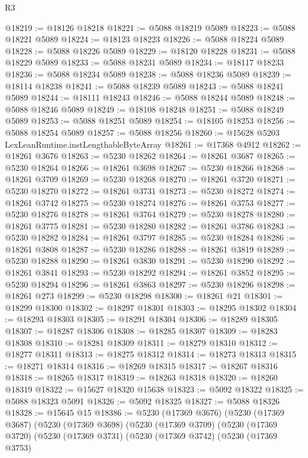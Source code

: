 \begin{lexlean}{R3}
\begin{coremodule}
@18219 := @18126 @18218
@18221 := @5088 @18219 @5089
@18223 := @5088 @18221 @5089
@18224 := @18123 @18223
@18226 := @5088 @18224 @5089
@18228 := @5088 @18226 @5089
@18229 := @18120 @18228
@18231 := @5088 @18229 @5089
@18233 := @5088 @18231 @5089
@18234 := @18117 @18233
@18236 := @5088 @18234 @5089
@18238 := @5088 @18236 @5089
@18239 := @18114 @18238
@18241 := @5088 @18239 @5089
@18243 := @5088 @18241 @5089
@18244 := @18111 @18243
@18246 := @5088 @18244 @5089
@18248 := @5088 @18246 @5089
@18249 := @18108 @18248
@18251 := @5088 @18249 @5089
@18253 := @5088 @18251 @5089
@18254 := @18105 @18253
@18256 := @5088 @18254 @5089
@18257 := @5088 @18256
@18260 := @15628 @5203 LexLeanRuntime.instLengthableByteArray
@18261 := @17368 @4912
@18262 := @18261 @3676
@18263 := @5230 @18262
@18264 := @18261 @3687
@18265 := @5230 @18264
@18266 := @18261 @3698
@18267 := @5230 @18266
@18268 := @18261 @3709
@18269 := @5230 @18268
@18270 := @18261 @3720
@18271 := @5230 @18270
@18272 := @18261 @3731
@18273 := @5230 @18272
@18274 := @18261 @3742
@18275 := @5230 @18274
@18276 := @18261 @3753
@18277 := @5230 @18276
@18278 := @18261 @3764
@18279 := @5230 @18278
@18280 := @18261 @3775
@18281 := @5230 @18280
@18282 := @18261 @3786
@18283 := @5230 @18282
@18284 := @18261 @3797
@18285 := @5230 @18284
@18286 := @18261 @3808
@18287 := @5230 @18286
@18288 := @18261 @3819
@18289 := @5230 @18288
@18290 := @18261 @3830
@18291 := @5230 @18290
@18292 := @18261 @3841
@18293 := @5230 @18292
@18294 := @18261 @3852
@18295 := @5230 @18294
@18296 := @18261 @3863
@18297 := @5230 @18296
@18298 := @18261 @273
@18299 := @5230 @18298
@18300 := @18261 @21
@18301 := @18299 @18300
@18302 := @18297 @18301
@18303 := @18295 @18302
@18304 := @18293 @18303
@18305 := @18291 @18304
@18306 := @18289 @18305
@18307 := @18287 @18306
@18308 := @18285 @18307
@18309 := @18283 @18308
@18310 := @18281 @18309
@18311 := @18279 @18310
@18312 := @18277 @18311
@18313 := @18275 @18312
@18314 := @18273 @18313
@18315 := @18271 @18314
@18316 := @18269 @18315
@18317 := @18267 @18316
@18318 := @18265 @18317
@18319 := @18263 @18318
@18320 := @18260 @18319
@18322 := @15627 @18320 @15638
@18323 := @5092 @18322
@18325 := @5088 @18323 @5091
@18326 := @5092 @18325
@18327 := @5088 @18326
@18328 := @15645 @15
@18386 := @5230
    (@17369 @3676)
    (@5230
      (@17369 @3687)
      (@5230
        (@17369 @3698)
        (@5230
          (@17369 @3709)
          (@5230
            (@17369 @3720)
            (@5230
              (@17369 @3731)
              (@5230
                (@17369 @3742)
                (@5230
                  (@17369 @3753)

\end{coremodule}
\end{lexlean}
